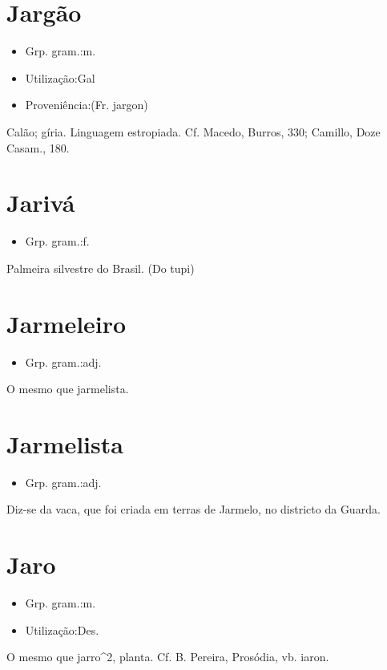 \documentclass{article}
\begin{document}
\section{Jargão}
\begin{itemize}
\item {Grp. gram.:m.}
\end{itemize}
\begin{itemize}
\item {Utilização:Gal}
\end{itemize}
\begin{itemize}
\item {Proveniência:(Fr. \textunderscore jargon\textunderscore )}
\end{itemize}
Calão; gíria.
Linguagem estropiada. Cf. Macedo, \textunderscore Burros\textunderscore , 330; Camillo, \textunderscore Doze Casam\textunderscore ., 180.
\section{Jarivá}
\begin{itemize}
\item {Grp. gram.:f.}
\end{itemize}
Palmeira silvestre do Brasil.
(Do tupi)
\section{Jarmeleiro}
\begin{itemize}
\item {Grp. gram.:adj.}
\end{itemize}
O mesmo que \textunderscore jarmelista\textunderscore .
\section{Jarmelista}
\begin{itemize}
\item {Grp. gram.:adj.}
\end{itemize}
Diz-se da vaca, que foi criada em terras de Jarmelo, no districto da Guarda.
\section{Jaro}
\begin{itemize}
\item {Grp. gram.:m.}
\end{itemize}
\begin{itemize}
\item {Utilização:Des.}
\end{itemize}
O mesmo que \textunderscore jarro\textunderscore ^2, planta. Cf. B. Pereira, \textunderscore Prosódia\textunderscore , vb. \textunderscore iaron\textunderscore .
\end{document}
